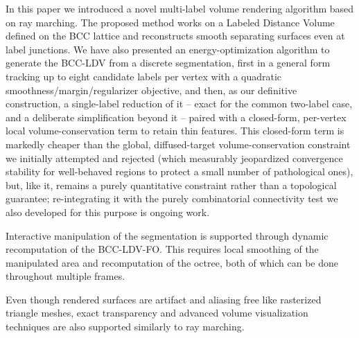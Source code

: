\documentclass[journal]{vgtc}                     %
\begin{document}
In this paper we introduced a novel multi-label volume rendering algorithm based on ray marching. The proposed method works on a Labeled Distance Volume defined on the BCC lattice and reconstructs smooth separating surfaces even at label junctions. We have also presented an energy-optimization algorithm to generate the BCC-LDV from a discrete segmentation, first in a general form tracking up to eight candidate labels per vertex with a quadratic smoothness/margin/regularizer objective, and then, as our definitive construction, a single-label reduction of it -- exact for the common two-label case, and a deliberate simplification beyond it -- paired with a closed-form, per-vertex local volume-conservation term to retain thin features. This closed-form term is markedly cheaper than the global, diffused-target volume-conservation constraint we initially attempted and rejected (which measurably jeopardized convergence stability for well-behaved regions to protect a small number of pathological ones), but, like it, remains a purely quantitative constraint rather than a topological guarantee; re-integrating it with the purely combinatorial connectivity test we also developed for this purpose is ongoing work.

Interactive manipulation of the segmentation is supported through dynamic recomputation of the BCC-LDV-FO. This requires local smoothing of the manipulated area and recomputation of the octree, both of which can be done throughout multiple frames.

Even though rendered surfaces are artifact and aliasing free like rasterized triangle meshes, exact transparency and advanced volume visualization techniques are also supported similarly to ray marching.





\end{document}
